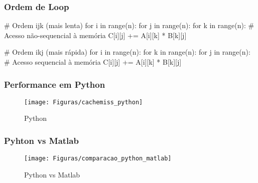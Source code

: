 \documentclass[utf8]{beamer}
\theoremstyle{definition}
\begin{document}
\begin{frame}[fragile]
	\frametitle{Ordem de Loop}
	\begin{semiverbatim}
		# Ordem ijk (mais lenta)
		for i in range(n):
		   for j in range(n):
		      for k in range(n):  # Acesso não-sequencial à memória
		        C[i][j] += A[i][k] * B[k][j]
		
		# Ordem ikj (mais rápida)
		for i in range(n):
		   for k in range(n):
		      for j in range(n):  # Acesso sequencial à memória
		         C[i][j] += A[i][k] * B[k][j]
	\end{semiverbatim}
\end{frame}

\begin{frame}
	\frametitle{Performance em Python}
	\begin{figure}[H]
		\centering
		\texttt{[image: Figuras/cachemiss\_python]}
		\caption{Python}
		\label{fig:performace_python}
	\end{figure}
\end{frame}

\begin{frame}
		\frametitle{Pyhton vs Matlab}
	\begin{figure}[H]
		\centering
		\texttt{[image: Figuras/comparacao\_python\_matlab]}
		\caption{Python vs Matlab}
		\label{fig:performace_python_vs_matlab}
	\end{figure}
\end{frame}

\end{document}
